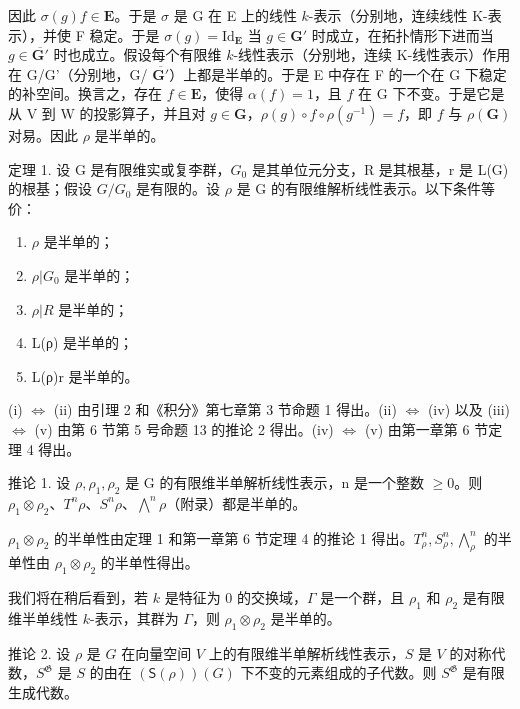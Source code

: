 因此 \(\sigma(g)f\in\mathbf{E}\)。于是 \(\sigma\) 是 G 在 E 上的线性 \(k\)-表示（分别地，连续线性 K-表示），并使 F 稳定。于是 \(\sigma(g)=\mathrm{Id}_{\mathbf{E}}\) 当 \(g\in\mathbf{G}'\) 时成立，在拓扑情形下进而当 \(g\in\overline{\mathbf{G}'}\) 时也成立。假设每个有限维 \(k\)-线性表示（分别地，连续 K-线性表示）作用在 G/G'（分别地，G/ \(\overline{\mathbf{G}'}\)）上都是半单的。于是 E 中存在 F 的一个在 G 下稳定的补空间。换言之，存在 \(f\in\mathbf{E}\)，使得 \(\alpha(f)=1\)，且 \(f\) 在 G 下不变。于是它是从 V 到 W 的投影算子，并且对 \(g\in\mathbf{G}\)，\(\rho(g)\circ f\circ\rho(g^{-1})=f\)，即 \(f\) 与 \(\rho(\mathbf{G})\) 对易。因此 \(\rho\) 是半单的。

定理 1. 设 G 是有限维实或复李群，\(G_{0}\) 是其单位元分支，R 是其根基，r 是 L(G) 的根基；假设 \(G/G_{0}\) 是有限的。设 \(\rho\) 是 G 的有限维解析线性表示。以下条件等价：

\begin{enumerate}
\def\labelenumi{(\roman{enumi})}
\item
  \(\rho\) 是半单的；
\item
  \(\rho|G_{0}\) 是半单的；
\item
  \(\rho|R\) 是半单的；
\item
  L(ρ) 是半单的；
\item
  L(ρ)\textbar r 是半单的。
\end{enumerate}

(i) \(\Leftrightarrow\) (ii) 由引理 2 和《积分》第七章第 3 节命题 1 得出。(ii) \(\Leftrightarrow\) (iv) 以及 (iii) \(\Leftrightarrow\) (v) 由第 6 节第 5 号命题 13 的推论 2 得出。(iv) \(\Leftrightarrow\) (v) 由第一章第 6 节定理 4 得出。

推论 1. 设 \(\rho, \rho_{1}, \rho_{2}\) 是 G 的有限维半单解析线性表示，n 是一个整数 \(\geqslant 0\)。则 \(\rho_{1} \otimes \rho_{2}\)、\(T^{n}\rho\)、\(S^{n}\rho\)、\(\bigwedge^{n}\rho\)（附录）都是半单的。

\(\rho_{1} \otimes \rho_{2}\) 的半单性由定理 1 和第一章第 6 节定理 4 的推论 1 得出。\(T^{n}_{\rho}, S^{n}_{\rho}, \bigwedge^{n}_{\rho}\) 的半单性由 \(\rho_{1} \otimes \rho_{2}\) 的半单性得出。

我们将在稍后看到，若 \(k\) 是特征为 0 的交换域，\(\Gamma\) 是一个群，且 \(\rho_1\) 和 \(\rho_2\) 是有限维半单线性 \(k\)-表示，其群为 \(\Gamma\)，则 \(\rho_1 \otimes \rho_2\) 是半单的。

推论 2. 设 \(\rho\) 是 \(G\) 在向量空间 \(V\) 上的有限维半单解析线性表示，\(S\) 是 \(V\) 的对称代数，\(S^{\mathfrak{G}}\) 是 \(S\) 的由在 \((\mathsf{S}(\rho))(G)\) 下不变的元素组成的子代数。则 \(S^{\mathfrak{G}}\) 是有限生成代数。

